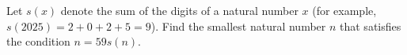 Let $s(x)$ denote the sum of the digits of a natural number $x$ (for example, $s(2025)=2+0+2+5=9$). Find the smallest natural number $n$ that satisfies the condition $n=59s(n)$.
